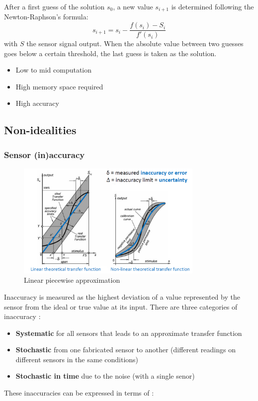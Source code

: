 After a first guess of the solution $s_0$, a new value $s_{i+1}$ is determined 
following the Newton-Raphson's formula: 
$$s_{i+1} = s_{i} - \frac{f(s_i)-S_i}{f'(s_i)}$$
with $S$ the sensor signal output. When the absolute value between two guesses goes below a certain threshold, the last guess is taken as the solution.

\begin{itemize}
    \item Low to mid computation
    \item High memory space required
    \item High accuracy
\end{itemize}

\subsection{Non-idealities}

\subsubsection{Sensor (in)accuracy}

\begin{figure}[H]
    \centering
    \includegraphics[width = 0.8\textwidth]{L1/img/inaccuracy.PNG}
    \caption{Linear piecewise approximation}
    \label{fig:innacuracy}
\end{figure}


Inaccuracy is measured as the highest deviation of a value represented by the sensor from the 
ideal or true value at its input. There are three categories of inaccuracy :

\begin{itemize}
    \item \textbf{Systematic} for all sensors
that leads to an approximate transfer function
    \item \textbf{Stochastic} from one fabricated
sensor to another (different readings on different sensors in the same conditions)
    \item \textbf{Stochastic in time} due to the noise (with a single senor)
\end{itemize}
These inaccuracies can be expressed in terms of :

